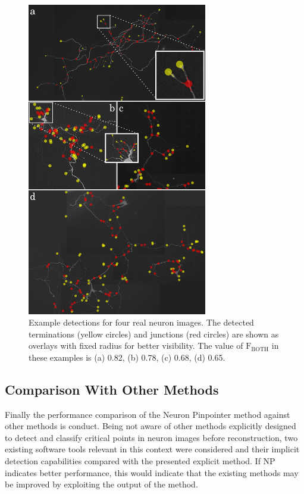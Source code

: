 \begin{figure}%
	\centering
	\includegraphics[width=0.7\textwidth,height=0.7\textheight,keepaspectratio]{det_real}
	\caption{Example detections for four real neuron images. The detected terminations (yellow circles) and junctions (red circles) are shown as overlays with fixed radius for better visibility. The value of $\textrm{F}_\textrm{BOTH}$ in these examples is (a) 0.82, (b) 0.78, (c) 0.68, (d) 0.65.}
	\label{fig:det-real}
\end{figure}
\subsection{Comparison With Other Methods}
\label{subsec:comparison}
Finally the performance comparison of the Neuron Pinpointer method against other methods is conduct. Being not aware of other methods explicitly designed to detect and classify critical points in neuron images before reconstruction, two existing software tools relevant in this context were considered and their implicit detection capabilities compared with the presented explicit method. If NP indicates better performance, this would indicate that the existing methods may be improved by exploiting the output of the method.

